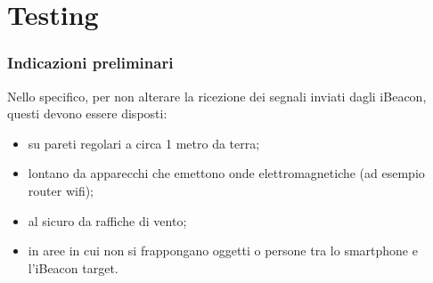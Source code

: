 \chapter{Testing}

\subsection{Indicazioni preliminari}
Nello specifico, per non alterare la ricezione dei segnali inviati dagli iBeacon, questi devono essere disposti:
\begin{itemize}
	\item su pareti regolari a circa 1 metro da terra;
	
	\item lontano da apparecchi che emettono onde elettromagnetiche (ad esempio router wifi);
	
	\item al sicuro da raffiche di vento;
	
	\item in aree in cui non si frappongano oggetti o persone tra lo smartphone e l'iBeacon target.
\end{itemize}